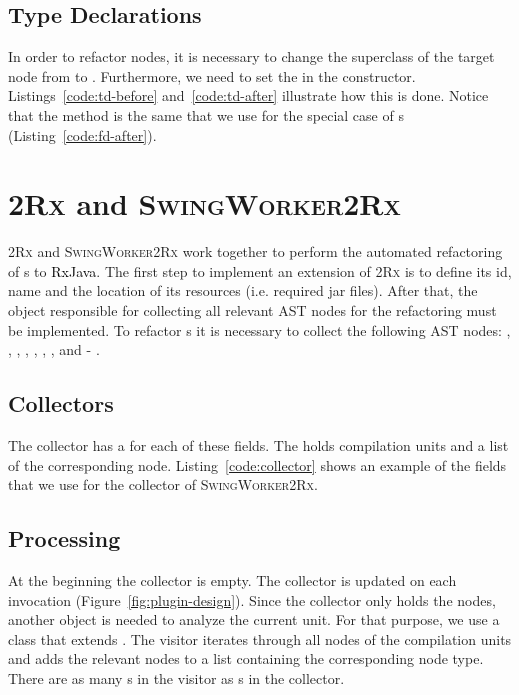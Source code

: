 \documentclass[type=bsc,accentcolor=tud9c]{tudthesis}
\newcommand{\framework}[1]{\textcolor{black}{#1}}
\newcommand{\toolcore}{\textsc{2Rx}}
\newcommand{\toolextension}{\textsc{SwingWorker2Rx}}
\begin{document}


\subsection{Type Declarations}
In order to refactor  nodes, it is necessary to change the superclass of the target node from  to . Furthermore, we need to set the  in the constructor. Listings~\ref{code:td-before} and~\ref{code:td-after} illustrate how this is done. Notice that the method  is the same that we use for the special case of s (Listing~\ref{code:fd-after}).



\section{\toolcore{} and \toolextension{}}
\toolcore{} and \toolextension{} work together to perform the automated refactoring of s to \framework{RxJava}. The first step to implement an extension of \toolcore{} is to define its id, name and the location of its resources (i.e. required jar files). After that, the object responsible for collecting all relevant AST nodes for the refactoring must be implemented. To refactor s it is necessary to collect the following AST nodes: , , , , , , ,  and - .


\subsection{Collectors}
The collector has a  for each of these fields. The  holds compilation units and a list of the corresponding node. Listing~\ref{code:collector} shows an example of the fields that we use for the collector of \toolextension{}.



\subsection{Processing}
At the beginning the collector is empty. The collector is updated on each  invocation (Figure~\ref{fig:plugin-design}). Since the collector only holds the nodes, another object is needed to analyze the current unit. For that purpose, we use a class that extends . The visitor iterates through all nodes of the compilation units and adds the relevant nodes to a list containing the corresponding node type. There are as many s in the visitor as s in the collector.
\end{document}
